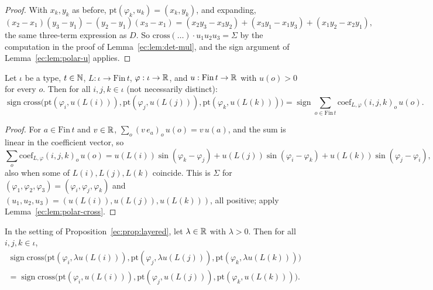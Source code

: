 \begin{proof}
With $x_k,y_k$ as before, $\mathrm{pt}(\varphi_k,u_k)=(x_k,y_k)$, and expanding,
\begin{equation*}
(x_2-x_1)(y_3-y_1)-(y_2-y_1)(x_3-x_1)=(x_2y_3-x_3y_2)+(x_3y_1-x_1y_3)+(x_1y_2-x_2y_1),
\end{equation*}
the same three-term expression as $D$. So $\mathrm{cross}(\dots)\cdot u_1u_2u_3=\Sigma$ by the computation in the proof
of Lemma~\ref{ec:lem:det-mul}, and the sign argument of Lemma~\ref{ec:lem:polar-u} applies.
\end{proof}

\begin{proposition}\label{ec:prop:layered}
Let $\iota$ be a type, $t\in\mathbb N$, $L:\iota\to\mathrm{Fin}\,t$, $\varphi:\iota\to\mathbb R$, and $u:\mathrm{Fin}\,t\to\mathbb R$ with
$u(o)>0$ for every $o$. Then for all $i,j,k\in\iota$ \textup{(}not necessarily distinct\textup{)}:
\begin{equation*}
\operatorname{sign}\mathrm{cross}\bigl(\mathrm{pt}(\varphi_i,u(L(i))),\mathrm{pt}(\varphi_j,u(L(j))),\mathrm{pt}(\varphi_k,u(L(k)))\bigr)
=\operatorname{sign}\sum_{o\in\mathrm{Fin}\,t}\mathrm{coef}_{L,\varphi}(i,j,k)_o\,u(o).
\end{equation*}
\end{proposition}

\begin{proof}
For $a\in\mathrm{Fin}\,t$ and $v\in\mathbb R$, $\sum_o(v\,e_a)_o\,u(o)=v\,u(a)$, and the sum is linear in the coefficient
vector, so
\begin{equation*}
\sum_o\mathrm{coef}_{L,\varphi}(i,j,k)_o\,u(o)=u(L(i))\sin(\varphi_k-\varphi_j)+u(L(j))\sin(\varphi_i-\varphi_k)
+u(L(k))\sin(\varphi_j-\varphi_i),
\end{equation*}
also when some of $L(i),L(j),L(k)$ coincide. This is $\Sigma$ for $(\varphi_1,\varphi_2,\varphi_3)=(\varphi_i,\varphi_j,\varphi_k)$
and $(u_1,u_2,u_3)=(u(L(i)),u(L(j)),u(L(k)))$, all positive; apply Lemma~\ref{ec:lem:polar-cross}.
\end{proof}

\begin{corollary}\label{ec:cor:scale}
In the setting of Proposition~\ref{ec:prop:layered}, let $\lambda\in\mathbb R$ with $\lambda>0$. Then for all $i,j,k\in\iota$,
\begin{multline*}
\operatorname{sign}\mathrm{cross}\bigl(\mathrm{pt}(\varphi_i,\lambda u(L(i))),\mathrm{pt}(\varphi_j,\lambda u(L(j))),\mathrm{pt}(\varphi_k,\lambda u(L(k)))\bigr)\\
=\operatorname{sign}\mathrm{cross}\bigl(\mathrm{pt}(\varphi_i,u(L(i))),\mathrm{pt}(\varphi_j,u(L(j))),\mathrm{pt}(\varphi_k,u(L(k)))\bigr).
\end{multline*}
\end{corollary}

